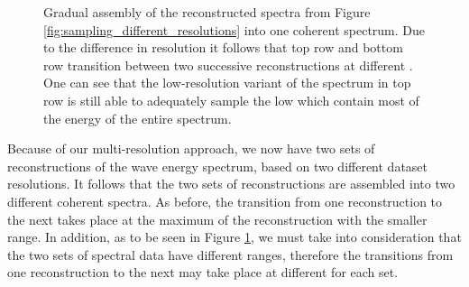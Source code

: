 \begin{figure}[p]
\caption[Gradual assembly of the reconstructed spectra from Figure
\ref{fig:sampling_different_resolutions} into one coherent spectrum.]{
Gradual assembly of the reconstructed spectra from Figure
\ref{fig:sampling_different_resolutions} into one coherent spectrum.
Due to the difference in resolution it follows that top row and bottom row
transition between two successive reconstructions at different \wavenumbers.
One can see that the low-resolution variant of the spectrum in top row is still
able to adequately sample the low \wavenumbers which contain most of the energy
of the entire spectrum.
}
\label{fig:sampling_different_resolutions_pattern_assembly}
\end{figure}
%
%
Because of our multi-resolution approach, we now have two sets of
reconstructions of the wave energy spectrum, based on two different
dataset resolutions.
It follows that the two sets of reconstructions are assembled into two
different coherent spectra.
As before, the transition from one reconstruction to the next takes place at
the maximum \wavenumber of the reconstruction with the smaller \wavenumber
range.
In addition, as to be seen in Figure \ref{fig:sampling_different_resolutions_pattern_assembly},
we must take into consideration that the two sets of
spectral data have different \wavenumber ranges, therefore the transitions from
one reconstruction to the next may take place at different \wavenumbers for
each set.\\

